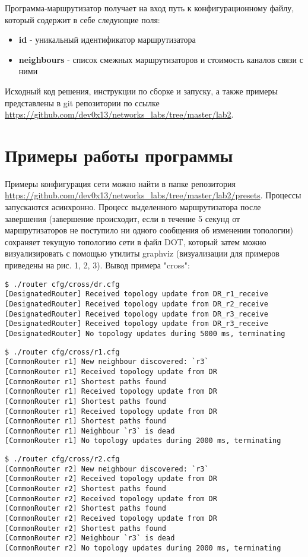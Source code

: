 \documentclass{report}
\begin{document}
\newline
Программа-маршрутизатор получает на вход путь к конфигурационному файлу, который содержит в себе следующие поля:
\begin{itemize}
    \item {\bf id} - уникальный идентификатор маршрутизатора
    \item {\bf neighbours} - список смежных маршрутизаторов и стоимость каналов связи с ними
\end{itemize}
\newline
Исходный код решения, инструкции по сборке и запуску, а также примеры представлены в git репозитории по ссылке \url{https://github.com/dev0x13/networks_labs/tree/master/lab2}.
\newpage
\section{Примеры работы программы}
Примеры конфигурация сети можно найти в папке репозитория \url{https://github.com/dev0x13/networks_labs/tree/master/lab2/presets}. Процессы запускаются асинхронно. Процесс выделенного маршрутизатора после завершения (завершение происходит, если в течение 5 секунд от маршрутизаторов не поступило ни одного сообщения об изменении топологии) сохраняет текущую топологию сети в файл DOT, который затем можно визуализировать с помощью утилиты graphviz (визуализации для примеров приведены на рис. 1, 2, 3).
\newline
\newline
Вывод примера "cross":
\begin{verbatim}
$ ./router cfg/cross/dr.cfg 
[DesignatedRouter] Received topology update from DR_r1_receive
[DesignatedRouter] Received topology update from DR_r2_receive
[DesignatedRouter] Received topology update from DR_r3_receive
[DesignatedRouter] Received topology update from DR_r3_receive
[DesignatedRouter] No topology updates during 5000 ms, terminating
\end{verbatim}
\begin{verbatim}
$ ./router cfg/cross/r1.cfg 
[CommonRouter r1] New neighbour discovered: `r3`
[CommonRouter r1] Received topology update from DR
[CommonRouter r1] Shortest paths found
[CommonRouter r1] Received topology update from DR
[CommonRouter r1] Shortest paths found
[CommonRouter r1] Received topology update from DR
[CommonRouter r1] Shortest paths found
[CommonRouter r1] Neighbour `r3` is dead
[CommonRouter r1] No topology updates during 2000 ms, terminating
\end{verbatim}
\begin{verbatim}
$ ./router cfg/cross/r2.cfg 
[CommonRouter r2] New neighbour discovered: `r3`
[CommonRouter r2] Received topology update from DR
[CommonRouter r2] Shortest paths found
[CommonRouter r2] Received topology update from DR
[CommonRouter r2] Shortest paths found
[CommonRouter r2] Received topology update from DR
[CommonRouter r2] Shortest paths found
[CommonRouter r2] Neighbour `r3` is dead
[CommonRouter r2] No topology updates during 2000 ms, terminating
\end{verbatim}
\end{document}

